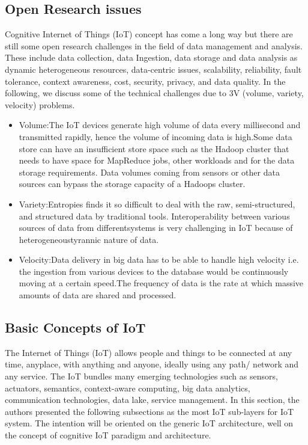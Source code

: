 \documentclass{article}
\begin{document}
\subsection{Open Research issues}

Cognitive Internet of Things (IoT) concept has come a long way but there are still some open research challenges in the field of data management and analysis. These include data collection, data Ingestion, data storage and data analysis as dynamic heterogeneous resources, data-centric issues, scalability, reliability, fault tolerance, context awareness, cost, security, privacy, and data quality. In the following, we discuss some of the technical challenges due to 3V (volume, variety, velocity) problems.

\begin{itemize}
    \item {Volume:The IoT devices generate high volume of data every millisecond and transmitted rapidly, hence the volume of incoming data is high.Some data store can have an insufficient store space such as the Hadoop cluster that needs to have space for MapReduce jobs, other workloads and for the data storage requirements. Data volumes coming from sensors or other data sources can bypass the storage capacity of a Hadoops cluster.}
    \item{Variety:Entropies finds it so difficult to deal with the raw, semi-structured, and structured data by traditional tools. Interoperability between various sources of data from differentsystems is very challenging in IoT because of heterogeneoustyrannic nature of data.}
    \item{Velocity:Data delivery in big data has to be able to handle high velocity i.e. the ingestion from various devices to the database would be continuously moving at a certain speed.The frequency of data is the rate at which massive amounts of data are shared and processed.}
\end{itemize}

\subsection{Basic Concepts of IoT}
The Internet of Things (IoT) allows people and things to be connected at any time, anyplace, with anything and anyone, ideally using any path/ network and any service. The IoT bundles many emerging technologies such as sensors, actuators, semantics, context-aware computing, big data analytics, communication technologies, data lake, service management. In this section, the authors presented the following subsections as the most IoT sub-layers for IoT system. The intention will be oriented on the generic IoT architecture, well on the concept of cognitive IoT paradigm and architecture.
\end{document}
